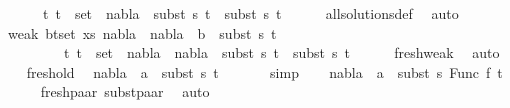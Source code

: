 \begin{isabellebody}
\ \ \ \ \ {\isachardoublequoteopen}{\isasymforall}\ {\isacharparenleft}{\kern0pt}t{}{\isacharcomma}{\kern0pt}\ t{}{\isacharparenright}{\kern0pt}\ {\isasymin}\ set\ {\isacharbrackleft}{\kern0pt}{\isacharbrackright}{\kern0pt}{\isachardot}{\kern0pt}\ nabla{}\ {\isasymturnstile}\ subst\ s{}\ t{}\ {\isasymapprox}\ subst\ s{}\ t{}{\isachardoublequoteclose}\isanewline
\ \ \ \ \isamarkupfalse%
\ all{\isacharunderscore}{\kern0pt}solutions{\isacharunderscore}{\kern0pt}def\ \isamarkupfalse%
\ auto\isanewline
\ \ \isamarkupfalse%
\ weak{}{\isacharcolon}{\kern0pt}\ {\isachardoublequoteopen}{\isasymforall}{\isacharparenleft}{\kern0pt}b{\isacharcomma}{\kern0pt}t{\isacharparenright}{\kern0pt}{\isasymin}set\ xs{\isachardot}{\kern0pt}\ {\isacharparenleft}{\kern0pt}nabla{}\ {\isasymunion}\ nabla{}{\isacharparenright}{\kern0pt}\ {\isasymturnstile}\ b\ {\isasymsharp}\ subst\ s{}\ t{\isachardoublequoteclose}\isanewline
\ \ \ \ \ \ \ \ {\isachardoublequoteopen}{\isasymforall}\ {\isacharparenleft}{\kern0pt}t{}{\isacharcomma}{\kern0pt}\ t{}{\isacharparenright}{\kern0pt}\ {\isasymin}\ set\ {\isacharbrackleft}{\kern0pt}{\isacharbrackright}{\kern0pt}{\isachardot}{\kern0pt}\ {\isacharparenleft}{\kern0pt}nabla{}\ {\isasymunion}\ nabla{}{\isacharparenright}{\kern0pt}\ {\isasymturnstile}\ subst\ s{}\ t{}\ {\isasymapprox}\ subst\ s{}\ t{}{\isachardoublequoteclose}\isanewline
\ \ \ \ \isamarkupfalse%
\ fresh{\isacharunderscore}{\kern0pt}weak\ \isamarkupfalse%
\ auto\isanewline
\ \ \isamarkupfalse%
\ fresh{\isacharunderscore}{\kern0pt}old\ \isamarkupfalse%
\ {\isachardoublequoteopen}nabla{}\ {\isasymturnstile}\ a\ {\isasymsharp}\ subst\ s{}\ t{\isacharprime}{\kern0pt}{\isachardoublequoteclose}\ \isanewline
\ \ \ \ \isamarkupfalse%
\ simp\isanewline
\ \ \isamarkupfalse%
\ {\isachardoublequoteopen}nabla{}\ {\isasymturnstile}\ a\ {\isasymsharp}\ subst\ s{}\ {\isacharparenleft}{\kern0pt}Func\ f\ t{\isacharprime}{\kern0pt}{\isacharparenright}{\kern0pt}{\isachardoublequoteclose}\isanewline
\ \ \ \ \isamarkupfalse%
\ fresh{\isacharunderscore}{\kern0pt}paar\ subst{\isacharunderscore}{\kern0pt}paar\ \isamarkupfalse%
\ auto\isanewline

\end{isabellebody}
